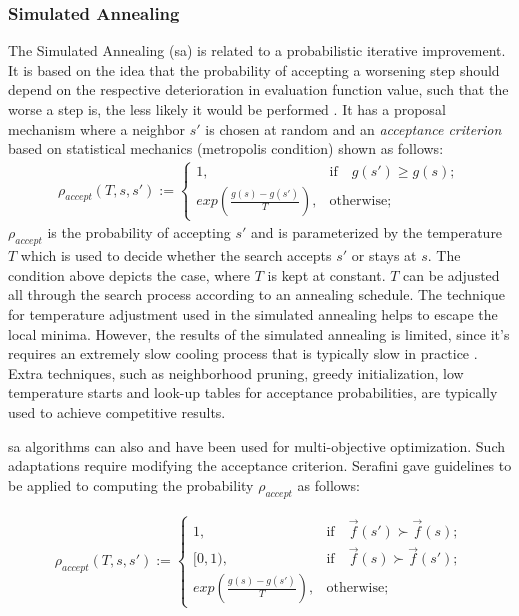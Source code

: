 \subsubsection{Simulated Annealing}
The Simulated Annealing (\gls{sa}) is related to a probabilistic iterative improvement. It is based on the idea that the probability of accepting a worsening step should depend on the respective deterioration in evaluation function value, such that the worse a step is, the less likely it would be performed \parencite{HolgerH2005StochasticSearch}. It has a proposal mechanism where a neighbor $s'$ is chosen at random and an \textit{acceptance criterion} based on statistical mechanics (metropolis condition) shown as follows:
\begin{align*}
    \rho_{accept}(T,s,s') := \begin{cases}
                            1, &\text{if}\quad g(s') \geq g(s);\\
                            exp(\frac{g(s)-g(s')}{T}), &\text{otherwise};
                             \end{cases}
\end{align*}
$\rho_{accept}$ is the probability of accepting $s'$ and is parameterized by the temperature $T$ which is used to decide whether the search accepts $s'$ or stays at $s$. The condition above depicts the case, where $T$ is kept at constant. $T$ can be adjusted all through the search process according to an annealing schedule. The technique for temperature adjustment used in the simulated annealing helps to escape the local minima. However, the results of the simulated annealing is limited, since it's requires an extremely slow cooling process that is typically slow in practice \parencite{HolgerH2005StochasticSearch}. Extra techniques, such as neighborhood pruning, greedy initialization, low temperature starts and look-up tables for acceptance probabilities, are typically used to achieve competitive results. 

\Gls{sa} algorithms can also and have been used for multi-objective optimization. Such adaptations require modifying the acceptance criterion. Serafini \parencite{Serafini1994SimulatedProblems} gave guidelines to be applied to computing the probability $\rho_{accept}$ as follows:

\begin{align*}
    \rho_{accept}(T,s,s') := \begin{cases}
                            1, &\text{if}\quad \Vec{f}(s') \succ \Vec{f}(s);\\
                            [0,1), &\text{if}\quad \Vec{f}(s) \succ \Vec{f}(s');\\
                            exp(\frac{g(s)-g(s')}{T}), &\text{otherwise};
                             \end{cases}
\end{align*}



